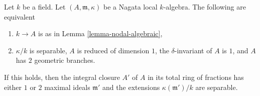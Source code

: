 \begin{lemma}
\label{lemma-2-branches-delta-1}
Let $k$ be a field. Let $(A, \mathfrak m, \kappa)$ be a
Nagata local $k$-algebra. The following are equivalent
\begin{enumerate}
\item $k \to A$ is as in Lemma \ref{lemma-nodal-algebraic},
\item $\kappa/k$ is separable, $A$ is reduced of dimension $1$,
the $\delta$-invariant of $A$ is $1$, and $A$ has $2$ geometric branches.
\end{enumerate}
If this holds, then the integral closure $A'$ of $A$
in its total ring of fractions has either $1$ or $2$
maximal ideals $\mathfrak m'$ and the extensions
$\kappa(\mathfrak m')/k$ are separable.
\end{lemma}

